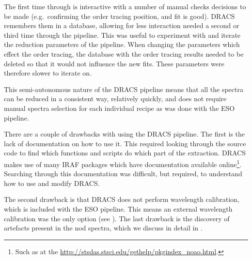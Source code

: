 The first time through is interactive with a number of manual checks decisions to be made (e.g.\ confirming the order tracing position, and fit is good). 
{DRACS} remembers them in a database, allowing for less interaction needed a second or third time through the pipeline. 
This was useful to experiment with and iterate the reduction parameters of the pipeline. 
When changing the parameters which effect the order tracing, the database with the order tracing results needed to be deleted so that it would not influence the new fits. 
These parameters were therefore slower to iterate on.

This semi-autonomous nature of the {DRACS} pipeline means that all the spectra can be reduced in a consistent way, relatively quickly, and does not require manual spectra selection for each individual recipe as was done with the {ESO} pipeline.

There are a couple of drawbacks with using the {DRACS} pipeline. 
The first is the lack of documentation on how to use it. 
This required looking through the source code to find which functions and scripts do which part of the extraction. 
{DRACS} makes use of many {IRAF} packages which have documentation available online\footnote{Such as at the \href{Space Telescope Science Institute}{http://stsdas.stsci.edu/gethelp/pkgindex\_noao.html}.}. 
Searching through this documentation was difficult, but required, to understand how to use and modify {DRACS}.

The second drawback is that {DRACS} does not perform wavelength calibration, which is included with the {ESO} pipeline. 
This means an external wavelength calibration was the only option (see ). 
The last drawback is the discovery of artefacts present in the nod spectra, which we discuss in detail in .

